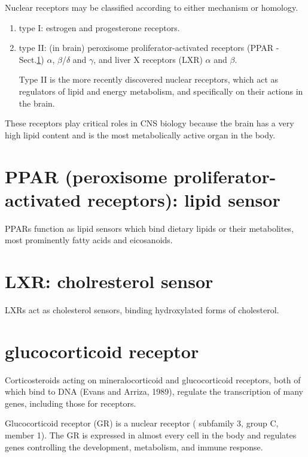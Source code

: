 Nuclear receptors may be classified according to either mechanism or
homology.

\begin{enumerate}
  \item type I: estrogen and progesterone receptors. 
  
  
  \item type II: (in brain) peroxisome proliferator-activated receptors (PPAR -
  Sect.\ref{sec:PPAR}) $\alpha$, $\beta$/$\delta$ and $\gamma$, and liver X
  receptors (LXR) $\alpha$ and $\beta$.
  
Type II is  the more recently discovered nuclear receptors, which act as
regulators of lipid and energy metabolism, and specifically on their actions in
the brain.
  
\end{enumerate}

These receptors play critical roles in CNS biology because the brain has a very
high lipid content and is the most metabolically active organ in the body.

\section{PPAR (peroxisome proliferator-activated receptors): lipid sensor}
\label{sec:PPAR}

PPARs function as lipid sensors which bind dietary lipids or their metabolites,
most prominently fatty acids and eicosanoids.

\section{LXR: cholresterol sensor}
\label{sec:LXR}

LXRs act as cholesterol sensors, binding hydroxylated forms of cholesterol.

\section{glucocorticoid receptor}
\label{sec:glucocorticoid-receptor}
\label{sec:corticosteroids}

Corticosteroids acting on mineralocorticoid and glucocorticoid receptors, both
of which bind to DNA (Evans and Arriza, 1989), regulate the transcription of
many genes, including those for receptors.

Glucocorticoid receptor (GR) is a nuclear receptor ( subfamily 3, group C,
member 1). The GR is expressed in almost every cell in the body and regulates
genes controlling the development, metabolism, and immune response.

